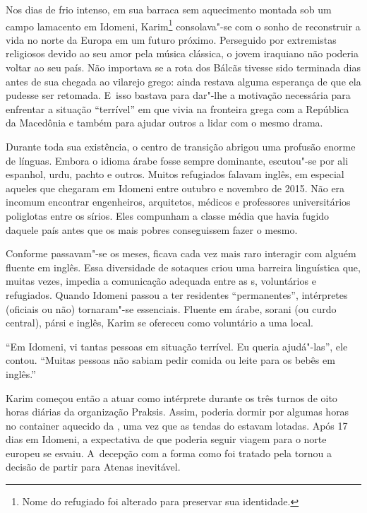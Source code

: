 \putodd{}
\clearpage


 

Nos dias de frio intenso, em sua barraca sem aquecimento montada sob um
campo lamacento em Idomeni, Karim\footnote{ Nome do refugiado foi alterado para preservar sua
identidade.}  consolava"-se com o
sonho de reconstruir a vida no norte da Europa em um futuro próximo.
Perseguido por extremistas religiosos devido ao seu amor pela música
clássica, o jovem iraquiano não poderia voltar ao seu país. Não
importava se a rota dos Bálcãs tivesse sido terminada dias antes de sua
chegada ao vilarejo grego: ainda restava alguma esperança de que ela
pudesse ser retomada. E~isso bastava para dar"-lhe a motivação necessária
para enfrentar a situação ``terrível'' em que vivia na fronteira grega
com a República da Macedônia e também para ajudar outros a lidar com o
mesmo drama.

Durante toda sua existência, o centro de transição abrigou uma
profusão enorme de línguas. Embora o idioma árabe fosse sempre
dominante, escutou"-se por ali espanhol, urdu, pachto e outros.
Muitos refugiados falavam inglês, em especial aqueles que chegaram em
Idomeni entre outubro e novembro de 2015. Não era incomum encontrar
 engenheiros, arquitetos, médicos e professores
universitários poliglotas entre os sírios. Eles compunham a classe média que havia
fugido daquele país antes que os mais pobres conseguissem fazer o mesmo.

Conforme passavam"-se os meses, ficava cada vez mais raro interagir com
alguém fluente em inglês. Essa diversidade de sotaques criou uma
barreira linguística que, muitas vezes, impedia a comunicação adequada entre as  s, voluntários e
refugiados. Quando Idomeni passou a ter
residentes ``permanentes'', intérpretes (oficiais ou não) tornaram"-se
essenciais. Fluente em árabe, sorani (ou curdo central), pársi e inglês,
Karim se ofereceu como voluntário a uma  local.

``Em Idomeni, vi tantas pessoas em situação terrível. Eu queria
ajudá"-las'', ele contou. ``Muitas pessoas não sabiam pedir comida ou
leite para os bebês em inglês.''

Karim começou então a atuar como intérprete durante os três turnos de
oito horas diárias da organização Praksis. Assim, poderia dormir por
algumas horas no container aquecido da , uma vez que as tendas do 
estavam lotadas. Após 17 dias em Idomeni, a expectativa de que poderia
seguir viagem para o norte europeu se esvaiu. A~decepção com a forma
como foi tratado pela  tornou a decisão de partir para Atenas
inevitável.

